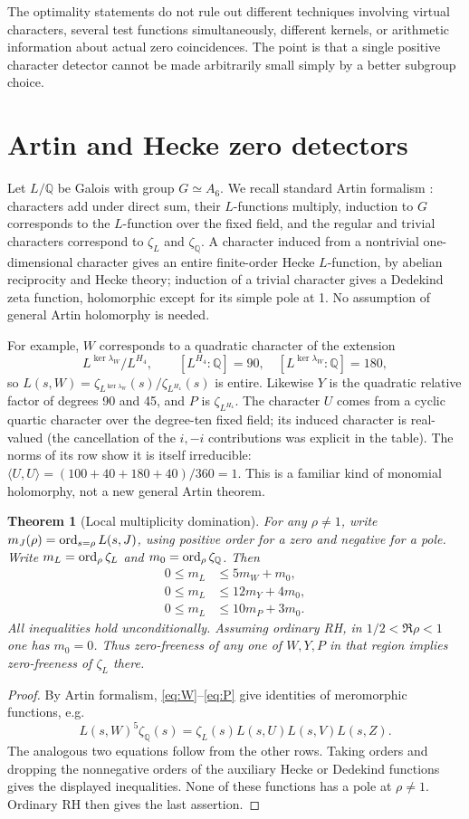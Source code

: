 \documentclass[11pt,letterpaper]{article}
\newtheorem{theorem}{Theorem}[section]
\theoremstyle{remark}\newtheorem{remark}[theorem]{Remark}
\newcommand{\Q}{\mathbb Q}\newcommand{\C}{\mathbb C}\newcommand{\R}{\mathbb R}
\begin{document}
The optimality statements do not rule out different techniques involving virtual characters, several test functions simultaneously, different kernels, or arithmetic information about actual zero coincidences. The point is that a single positive character detector cannot be made arbitrarily small simply by a better subgroup choice.

\section{Artin and Hecke zero detectors}\label{sec:artin}
Let $L/\Q$ be Galois with group $G\simeq A_6$. We recall standard Artin formalism \cite{artin,booker}: characters add under direct sum, their $L$-functions multiply, induction to $G$ corresponds to the $L$-function over the fixed field, and the regular and trivial characters correspond to $\zeta_L$ and $\zeta_{\Q}$. A character induced from a nontrivial one-dimensional character gives an entire finite-order Hecke $L$-function, by abelian reciprocity and Hecke theory; induction of a trivial character gives a Dedekind zeta function, holomorphic except for its simple pole at 1. No assumption of general Artin holomorphy is needed.

For example, $W$ corresponds to a quadratic character of the extension
\[
 L^{\ker\lambda_W}/L^{H_4},\qquad [L^{H_4}:\Q]=90,
 \quad [L^{\ker\lambda_W}:\Q]=180,
\]
so $L(s,W)=\zeta_{L^{\ker\lambda_W}}(s)/\zeta_{L^{H_4}}(s)$ is entire. Likewise $Y$ is the quadratic relative factor of degrees 90 and 45, and $P$ is $\zeta_{L^{H_4}}$. The character $U$ comes from a cyclic quartic character over the degree-ten fixed field; its induced character is real-valued (the cancellation of the $i,-i$ contributions was explicit in the table). The norms of its row show it is itself irreducible: $\langle U,U\rangle=(100+40+180+40)/360=1$. This is a familiar kind of monomial holomorphy, not a new general Artin theorem.

\begin{theorem}[Local multiplicity domination]\label{thm:orders}
For any $\rho\ne1$, write $m_J(\rho)=\operatorname{ord}_{s=\rho}L(s,J)$, using positive order for a zero and negative for a pole. Write $m_L=\operatorname{ord}_\rho\zeta_L$ and $m_0=\ord_\rho\zeta_{\Q}$. Then
\begin{align*}
 0\le m_L&\le 5m_W+m_0,\\
 0\le m_L&\le 12m_Y+4m_0,\\
 0\le m_L&\le 10m_P+3m_0.
\end{align*}
All inequalities hold unconditionally. Assuming ordinary RH, in $1/2<\Re\rho<1$ one has $m_0=0$. Thus zero-freeness of any one of $W,Y,P$ in that region implies zero-freeness of $\zeta_L$ there.
\end{theorem}
\begin{proof}
By Artin formalism, \eqref{eq:W}--\eqref{eq:P} give identities of meromorphic functions, e.g.
\[
 L(s,W)^5\zeta_{\Q}(s)=\zeta_L(s)L(s,U)L(s,V)L(s,Z).
\]
The analogous two equations follow from the other rows. Taking orders and dropping the nonnegative orders of the auxiliary Hecke or Dedekind functions gives the displayed inequalities. None of these functions has a pole at $\rho\ne1$. Ordinary RH then gives the last assertion.
\end{proof}
\end{document}
